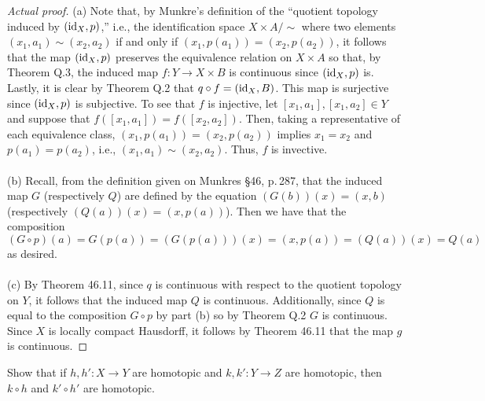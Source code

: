 \begin{proof}[Actual proof]
(a) Note that, by Munkre's definition of the ``quotient topology induced by
$(\operatorname{id}_X,p)$,'' i.e., the identification space $X\times A/{\sim}$ where two
elements $(x_1,a_1)\sim (x_2,a_2)$ if and only if
$(x_1,p(a_1))=(x_2,p(a_2))$, it follows that the map $(\operatorname{id}_X,p)$ preserves
the equivalence relation on $X\times A$ so that, by Theorem Q.3, the
induced map $f\colon Y\to X\times B$ is continuous since $(\operatorname{id}_X,p)$
is. Lastly, it is clear by Theorem Q.2 that $q\circ f=(\operatorname{id}_X,B)$. This map
is surjective since $(\operatorname{id}_X,p)$ is subjective. To see that $f$ is
injective, let $[x_1,a_1],[x_1,a_2]\in Y$ and suppose that
$f([x_1,a_1])=f([x_2,a_2])$. Then, taking a representative of each
equivalence class, $(x_1,p(a_1))=(x_2,p(a_2))$ implies $x_1=x_2$ and
$p(a_1)=p(a_2)$, i.e., $(x_1,a_1)\sim (x_2,a_2)$. Thus, $f$ is invective.
\\\\
(b) Recall, from the definition given on Munkres \S46, p.\,287,
that the induced map $G$ (respectively $Q$) are defined by the
equation $(G(b))(x)=(x,b)$ (respectively
$(Q(a))(x)=(x,p(a))$). Then we have that the composition
\[
(G\circ p)(a)=G(p(a))=(G(p(a)))(x)=(x,p(a))=(Q(a))(x)=Q(a)
\]
as desired.
\\\\
(c) By Theorem 46.11, since $q$ is continuous with respect to the
quotient topology on $Y$, it follows that the induced map $Q$ is
continuous. Additionally, since $Q$ is equal to the composition
$G\circ p$ by part (b) so by Theorem Q.2 $G$ is continuous. Since
$X$ is locally compact Hausdorff, it follows by Theorem 46.11
that the map $g$ is continuous.
\end{proof}
\newpage
\begin{problem}[Munkres \S51, Ex.\,1]
Show that if $h,h'\colon X\to Y$ are homotopic and $k,k'\colon
Y\to Z$ are homotopic, then $k\circ h$ and $k'\circ h'$ are
homotopic.
\end{problem}
